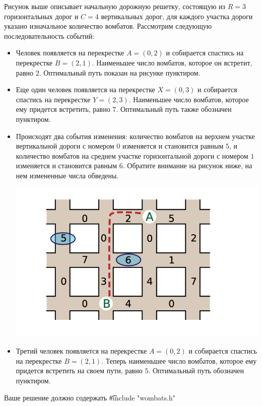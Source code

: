 Рисунок выше описывает начальную дорожную решетку, состоящую из $R = 3$ горизонтальных дорог и $C = 4$ вертикальных дорог, для каждого участка дороги указано изначальное количество вомбатов. Рассмотрим следующую последовательность событий:
\begin{itemize}
\item Человек появляется на перекрестке $A = (0,2)$ и собирается спастись на перекрестке $B = (2,1)$. Наименьшее число вомбатов, которое он встретит, равно $2$. Оптимальный путь показан на рисунке пунктиром.
\item Еще один человек появляется на перекрестке $X = (0,3)$ и собирается спастись на перекрестке $Y = (2,3)$. Наименьшее число вомбатов, которое ему придется встретить, равно $7$. Оптимальный путь также обозначен пунктиром.
\item Происходят два события ­изменения: количество вомбатов на верхнем участке вертикальной дороги с номером $0$ изменяется и становится равным $5$, и количество вомбатов на среднем участке горизонтальной дороги с номером $1$ изменяется и становится равным $6$. Обратите внимание на рисунок ниже, на нем измененные числа обведены.

\includegraphics{wombats3.png}

\item Третий человек появляется на перекрестке $A = (0,2)$ и собирается спастись на перекрестке $B = (2,1)$. Теперь наименьшее число вомбатов, которое ему придется встретить на своем пути, равно $5$. Оптимальный путь обозначен пунктиром.
\end{itemize}

Ваше решение должно содержать \t{\#include "wombats.h"}